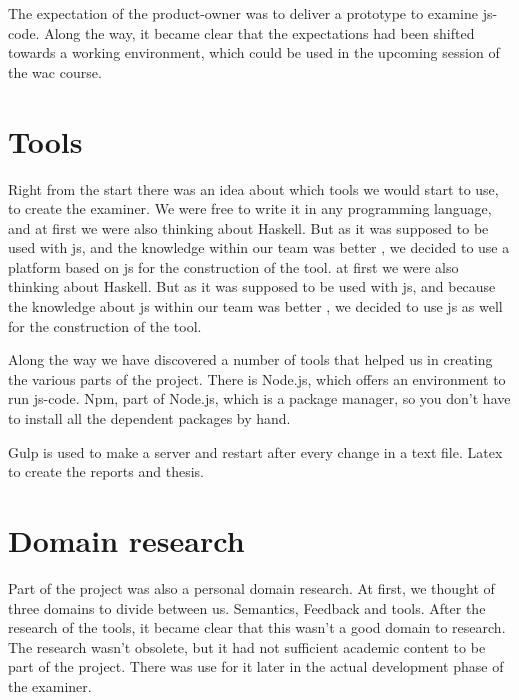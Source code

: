 The expectation of the product-owner was to deliver a prototype to examine \gls{js-code}.
Along the way, it became clear that the expectations had been shifted towards a working environment, which could be used in the upcoming session of the \gls{wac} course.

\section{Tools}

Right from the start there was an idea about which tools we would start to use, to create the examiner. We were free to write it in any programming language, and
at first we were also thinking about Haskell.			
But as it was supposed to be used with \gls{js}, and the knowledge within our
team was better 
, we decided to use a platform based on \gls{js} for the construction of the tool. 
at first we were also thinking about Haskell.
But as it was supposed to be used with \gls{js}, and because the knowledge about \gls{js} within our
team was better %
, we decided to use \gls{js} as well for the construction of the tool.

Along the way we have discovered a number of tools that helped us in creating the various parts of the project.
There is Node.js, which offers an environment to run \gls{js-code}.
Npm, part of Node.js, which is a package manager, so you don't have to install
all the dependent packages by hand.

Gulp is used to make a server and restart after every change in a text file.
Latex to create the reports and thesis.

\section{Domain research}
Part of the project was also a personal domain research. At first, we thought of
three domains to divide between us.
Semantics, Feedback and tools.
After the research of the tools, it became clear that this wasn't a good domain
to research.
The research wasn't obsolete, but it had not sufficient academic content to be
part of the project.
There was use for it later in the actual development phase of the \gls{examiner}.
